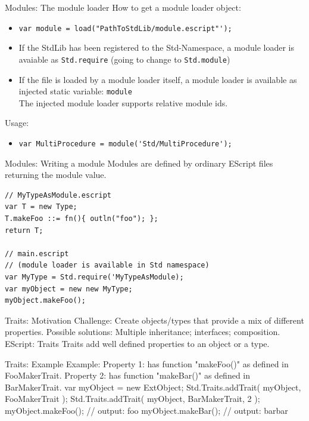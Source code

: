 \documentclass[ucs,9pt]{beamer}
\begin{document}
\begin{frame}{Modules: The module loader}
How to get a module loader object:
\begin{itemize}
\item \lstinline!var module = load("PathToStdLib/module.escript"'); !
\item If the StdLib has been registered to the Std-Namespace, a module loader is avaiable as \lstinline!Std.require! (going to change to \lstinline!Std.module!)
\item If the file is loaded by a module loader itself, a module loader is available as injected static variable: \lstinline!module!\\
The injected module loader supports relative module ids.
\end{itemize}
Usage:
\begin{itemize}
\item \lstinline!var MultiProcedure = module('Std/MultiProcedure');!
\end{itemize}
\end{frame}



\begin{frame}{Modules: Writing a module}
Modules are defined by ordinary EScript files returning the module value.
\begin{lstlisting}
// MyTypeAsModule.escript
var T = new Type;
T.makeFoo ::= fn(){	outln("foo"); };
return T;

// main.escript
// (module loader is available in Std namespace)
var MyType = Std.require('MyTypeAsModule);
var myObject = new new MyType;
myObject.makeFoo();
\end{lstlisting}
 
\end{frame}

\begin{frame}{Traits: Motivation}
Challenge: Create objects/types that provide a mix of different properties.
Possible solutions: Multiple inheritance; interfaces; composition.
EScript: Traits 
Traits add well defined properties to an object or a type.
\end{frame}

\begin{frame}{Traits: Example}
Example: 
	Property 1: has function "makeFoo()" as defined in FooMakerTrait.
	Property 2: has function "makeBar()" as defined in BarMakerTrait.
var myObject = new ExtObject;
Std.Traits.addTrait( myObject, FooMakerTrait );
Std.Traits.addTrait( myObject, BarMakerTrait, 2 );
myObject.makeFoo(); // output: foo
myObject.makeBar(); // output: barbar
\end{frame}
\end{document}
